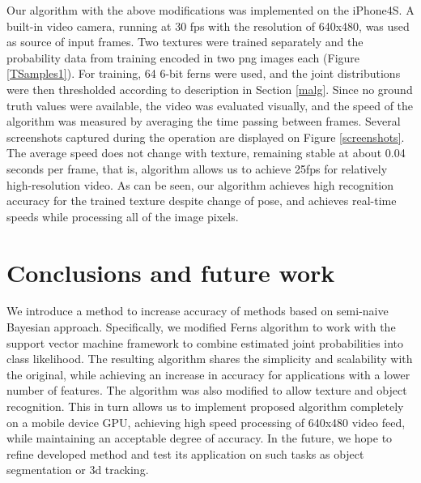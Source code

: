 \documentclass[10pt,twocolumn, a4paper]{article}
\begin{document}
Our algorithm with the above modifications was implemented on the iPhone4S. A built-in video camera, running at 30 fps with the resolution of 640x480, was used as source of input frames. Two textures were trained separately and the probability data from training encoded in two png images each (Figure \ref{TSamples1}). For training, 64 6-bit ferns were used, and the joint distributions were then thresholded according to description in Section \ref{malg}. Since no ground truth values were available, the video was evaluated visually, and the speed of the algorithm was measured by averaging the time passing between frames. Several screenshots captured during the operation are displayed on Figure \ref {screenshots}. The average speed does not change with texture, remaining stable at about 0.04 seconds per frame, that is, algorithm allows us to achieve 25fps for relatively high-resolution video.  As can be seen, our algorithm achieves high recognition accuracy for the trained texture despite change of pose, and achieves real-time speeds while processing all of the image pixels. 
\section{Conclusions and future work}
\label{conclusion}
We introduce a method to increase accuracy of methods based on semi-naive Bayesian approach. Specifically, we modified Ferns algorithm to work with the support vector machine framework to combine estimated joint probabilities into class likelihood. The resulting algorithm shares the simplicity and scalability with the original, while achieving an increase in accuracy for applications with a lower number of features. The algorithm was also modified to allow texture and object recognition. This in turn allows us to implement proposed algorithm completely on a mobile device GPU, achieving high speed processing of 640x480 video feed, while maintaining an acceptable degree of accuracy.
In the future, we hope to refine developed method and test its application on such tasks as object segmentation or 3d tracking.




\end{document}
